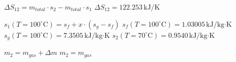 \( \Delta S_{12} = m_{total} \cdot s_2 - m_{total} \cdot s_1 \)  
\( \Delta S_{12} = 122.253 \, \text{kJ/K} \)  

\( s_1(T = 100^\circ \text{C}) = s_f + x \cdot (s_g - s_f) \)  
\( s_f(T = 100^\circ \text{C}) = 1.03005 \, \text{kJ/kg·K} \)  
\( s_g(T = 100^\circ \text{C}) = 7.3505 \, \text{kJ/kg·K} \)  
\( s_2(T = 70^\circ \text{C}) = 0.9540 \, \text{kJ/kg·K} \)  

\( m_2 = m_{gas} + \Delta m \)  
\( m_2 = m_{gas} \)